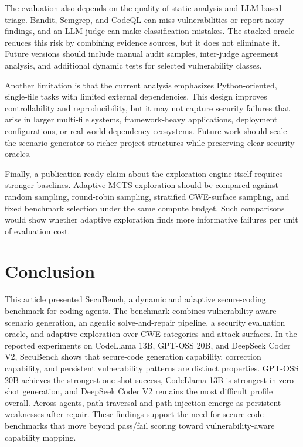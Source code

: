 \documentclass[11pt]{article}
\newcommand{\toolname}{SecuBench}
\begin{document}
The evaluation also depends on the quality of static analysis and LLM-based triage. Bandit, Semgrep, and CodeQL can miss vulnerabilities or report noisy findings, and an LLM judge can make classification mistakes. The stacked oracle reduces this risk by combining evidence sources, but it does not eliminate it. Future versions should include manual audit samples, inter-judge agreement analysis, and additional dynamic tests for selected vulnerability classes.

Another limitation is that the current analysis emphasizes Python-oriented, single-file tasks with limited external dependencies. This design improves controllability and reproducibility, but it may not capture security failures that arise in larger multi-file systems, framework-heavy applications, deployment configurations, or real-world dependency ecosystems. Future work should scale the scenario generator to richer project structures while preserving clear security oracles.

Finally, a publication-ready claim about the exploration engine itself requires stronger baselines. Adaptive MCTS exploration should be compared against random sampling, round-robin sampling, stratified CWE-surface sampling, and fixed benchmark selection under the same compute budget. Such comparisons would show whether adaptive exploration finds more informative failures per unit of evaluation cost.

\FloatBarrier
\section{Conclusion}

This article presented \toolname{}, a dynamic and adaptive secure-coding benchmark for coding agents. The benchmark combines vulnerability-aware scenario generation, an agentic solve-and-repair pipeline, a security evaluation oracle, and adaptive exploration over CWE categories and attack surfaces. In the reported experiments on CodeLlama 13B, GPT-OSS 20B, and DeepSeek Coder V2, \toolname{} shows that secure-code generation capability, correction capability, and persistent vulnerability patterns are distinct properties. GPT-OSS 20B achieves the strongest one-shot success, CodeLlama 13B is strongest in zero-shot generation, and DeepSeek Coder V2 remains the most difficult profile overall. Across agents, path traversal and path injection emerge as persistent weaknesses after repair. These findings support the need for secure-code benchmarks that move beyond pass/fail scoring toward vulnerability-aware capability mapping.
\end{document}

